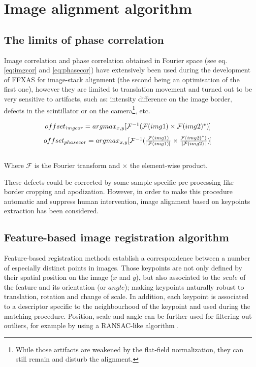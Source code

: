 \documentclass[preprint]{iucr}
\begin{document}
\section{Image alignment algorithm}

\subsection{The limits of phase correlation}

Image correlation and phase correlation obtained in Fourier space (see eq.
\ref{eq:imgcor} and \ref{eq:phasecor}) have
extensively been used during the development of FFXAS for image-stack alignment
(the second being an optimisation of the first one), however they are
limited to translation movement and turned out to be very sensitive to artifacts, such as:
intensity difference on the image border, defects in the
scintillator or on the camera\footnote{While those artifacts are weakened by
the flat-field normalization, they can still remain and disturb the alignment.},
etc.

\begin{center}
\begin{equation}
\label{eq:imgcor}
$$offset_{img cor} =
argmax_{x,y}[\mathcal{F}^{-1}(\mathcal{F}(img1)\times\mathcal{F}(img2)^*)]$$
\end{equation}
\begin{equation}
\label{eq:phasecor}
$$offset_{phase cor} =
argmax_{x,y}[\mathcal{F}^{-1}(\frac{\mathcal{F}(img1)}{|\mathcal{F}(img1)|}
\times\frac{\mathcal{F}(img2)^*)}{|\mathcal{F}(img2)|})]$$
\end{equation}
\\Where $\mathcal{F}$ is the Fourier transform and $\times$ the element-wise
product.
\end{center}

These defects could be corrected by some sample
specific pre-processing like border cropping and apodization.
However, in order to make this procedure automatic and suppress human
intervention, image alignment based on keypoints extraction has been
considered.

\subsection{Feature-based image registration algorithm}

Feature-based registration methods establish a correspondence between a
number of especially distinct points in images.
Those keypoints are not only defined by their spatial position on the image
($x$ and $y$), but also associated to the $scale$ of the feature and its
orientation (or $angle$);
making keypoints naturally robust to
translation, rotation and change of scale.
In addition, each keypoint is associated to a descriptor specific to the
neighbourhood of the keypoint and used during the matching procedure. Position,
scale and angle can be further used for filtering-out outliers, for example by
using a RANSAC-like algorithm \cite{orsa}.
\end{document}
